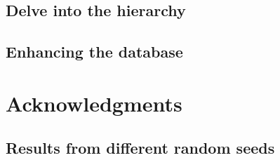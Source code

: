 \documentclass[a4paper, headings=standardclasses]{scrartcl}
\begin{document}
\subsection{Delve into the hierarchy}

\subsection{Enhancing the database}

\section*{Acknowledgments}

\clearpage
\begin{refcontext}[sorting=nyt]
  \printbibliography
\end{refcontext}
\clearpage

\begin{appendices}
  \section{Results from different random seeds}

\end{appendices}
\end{document}
